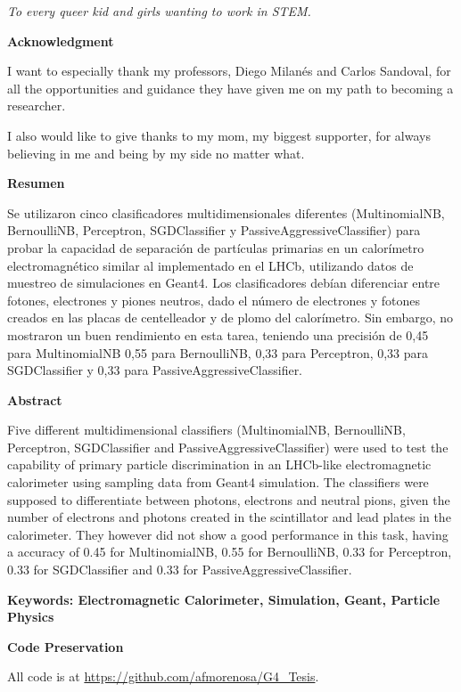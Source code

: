 
\begin{flushright}
\begin{minipage}{8cm}
    \noindent
        \small
        \textit{To every queer kid and girls wanting to work in STEM.}
\end{minipage}
\end{flushright}

\newpage{\pagestyle{empty}}

\newpage
\thispagestyle{empty} \textbf{}\normalsize


\textbf{\LARGE Acknowledgment}

I want to especially thank my professors, Diego Milanés and Carlos Sandoval,
for all the opportunities and guidance they have given me on my path to
becoming a researcher.

I also would like to give thanks to my mom, my biggest supporter, for always
believing in me and being by my side no matter what.

\newpage{\pagestyle{empty}\cleardoublepage}

\newpage
\textbf{\LARGE Resumen}

Se utilizaron cinco clasificadores multidimensionales diferentes
(MultinomialNB, BernoulliNB, Perceptron, SGDClassifier y
PassiveAggressiveClassifier) para probar la capacidad de separación de
partículas primarias en un calorímetro electromagnético similar al implementado
en el LHCb, utilizando datos de muestreo de simulaciones en Geant4. Los
clasificadores debían diferenciar entre fotones, electrones y piones neutros,
dado el número de electrones y fotones creados en las placas de centelleador y
de plomo del calorímetro. Sin embargo, no mostraron un buen rendimiento en esta
tarea, teniendo una precisión de 0,45 para MultinomialNB 0,55 para BernoulliNB,
0,33 para Perceptron, 0,33 para SGDClassifier y 0,33 para
PassiveAggressiveClassifier.

\textbf{\LARGE Abstract}


Five different multidimensional classifiers (MultinomialNB, BernoulliNB,
Perceptron, SGDClassifier and PassiveAggressiveClassifier) were used to test
the capability of primary particle discrimination in an LHCb-like
electromagnetic calorimeter using sampling data from Geant4 simulation. The
classifiers were supposed to differentiate between photons, electrons and
neutral pions, given the number of electrons and photons created in the
scintillator and lead plates in the calorimeter. They however did not show a
good performance in this task, having a accuracy of 0.45 for MultinomialNB,
0.55 for BernoulliNB, 0.33 for Perceptron, 0.33 for SGDClassifier and 0.33 for
PassiveAggressiveClassifier.

\textbf{\small Keywords: Electromagnetic Calorimeter, Simulation, Geant, Particle Physics}\\

\newpage{}

\textbf{\LARGE Code Preservation}

All code is at \url{https://github.com/afmorenosa/G4_Tesis}.
